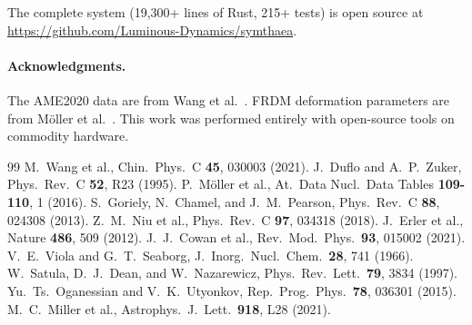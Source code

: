 \documentclass[twocolumn,letterpaper,10pt]{article}
\begin{document}
The complete system (19,300+ lines of Rust, 215+ tests) is open source at
\url{https://github.com/Luminous-Dynamics/symthaea}.

\paragraph{Acknowledgments.}
The AME2020 data are from Wang et al.~\cite{ame2020}. FRDM deformation
parameters are from M\"oller et al.~\cite{moller2016}. This work was
performed entirely with open-source tools on commodity hardware.



\begin{thebibliography}{99}
 M.~Wang et al., Chin.\ Phys.\ C \textbf{45}, 030003 (2021).
 J.~Duflo and A.~P.~Zuker, Phys.\ Rev.\ C \textbf{52}, R23 (1995).
 P.~M\"oller et al., At.\ Data Nucl.\ Data Tables \textbf{109-110}, 1 (2016).
 S.~Goriely, N.~Chamel, and J.~M.~Pearson, Phys.\ Rev.\ C \textbf{88}, 024308 (2013).
 Z.~M.~Niu et al., Phys.\ Rev.\ C \textbf{97}, 034318 (2018).
 J.~Erler et al., Nature \textbf{486}, 509 (2012).
 J.~J.~Cowan et al., Rev.\ Mod.\ Phys.\ \textbf{93}, 015002 (2021).
 V.~E.~Viola and G.~T.~Seaborg, J.\ Inorg.\ Nucl.\ Chem.\ \textbf{28}, 741 (1966).
 W.~Satula, D.~J.~Dean, and W.~Nazarewicz, Phys.\ Rev.\ Lett.\ \textbf{79}, 3834 (1997).
 Yu.~Ts.~Oganessian and V.~K.~Utyonkov, Rep.\ Prog.\ Phys.\ \textbf{78}, 036301 (2015).
 M.~C.~Miller et al., Astrophys.\ J.\ Lett.\ \textbf{918}, L28 (2021).
\end{thebibliography}
\end{document}
